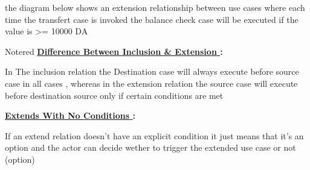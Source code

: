 \vspace{0.25cm}
the diagram below shows an extension relationship between use cases where each time the transfert case is invoked
the balance check case will be executed if the value is \textgreater= 10000 DA

\vspace{0.15cm}


        \begin{center}
    \end{center}

        \vspace{1cm}

\begin{prettyBox}{Note}{red}
\textbf{\underline{Difference Between Inclusion \& Extension }:}

\vspace{0.2cm}
In The inclusion relation the Destination case will always execute before source case in all cases , whereas
in the extension relation the source case will execute before destination source only if certain conditions
are met

\vspace{0.25cm}

\textbf{\underline{Extends With No Conditions }:}

\vspace{0.2cm}
If an extend relation doesn't have an explicit condition it just means that it's an option and
the actor can decide wether to trigger the extended use case or not (option)

\end{prettyBox}


